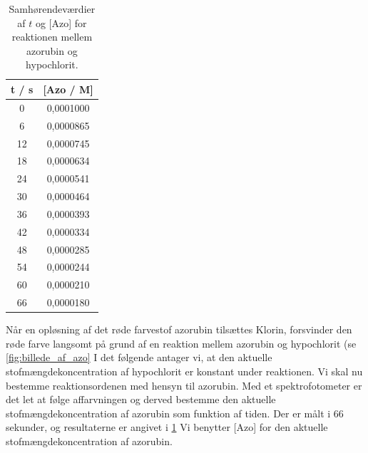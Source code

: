 \documentclass[a4paper, 11pt, twocolumn]{report}
\begin{document}
    \begin{table}
    \caption{Samhørendeværdier af $t$ og [Azo] for reaktionen mellem azorubin og hypochlorit.}
    \label{wrap-tab:Azo_table}
        \begin{tabular}{|c|c|}
             \hline
             t / s & [Azo / M] \\
             \hline
             0  & 0,0001000 \\
             6  & 0,0000865 \\
             12 & 0,0000745 \\
             18 & 0,0000634 \\
             24 & 0,0000541 \\
             30 & 0,0000464 \\
             36 & 0,0000393 \\
             42 & 0,0000334 \\
             48 & 0,0000285 \\
             54 & 0,0000244 \\
             60 & 0,0000210 \\
             66 & 0,0000180 \\
             \hline
        \end{tabular}
    \end{table}
    Når en opløsning af det røde farvestof azorubin tilsættes Klorin, forsvinder den røde farve langsomt på grund af en reaktion mellem azorubin og hypochlorit (se \ref{fig:billede_af_azo} I det følgende antager vi, at den aktuelle stofmængdekoncentration af hypochlorit er konstant under reaktionen. Vi skal nu bestemme reaktionsordenen med hensyn til azorubin.
    Med et spektrofotometer er det let at følge affarvningen og derved bestemme den aktuelle stofmængdekoncentration af azorubin som funktion af tiden. Der er målt i 66 sekunder, og resultaterne er angivet i \ref{wrap-tab:Azo_table} Vi benytter [Azo] for den aktuelle stofmængdekoncentration af azorubin.
    
\end{document}
